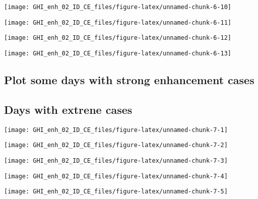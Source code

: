 \documentclass[
  10pt,
  a4paper,oneside]{article}
\begin{document}
\begin{center}\texttt{[image: GHI\_enh\_02\_ID\_CE\_files/figure-latex/unnamed-chunk-6-10]} \end{center}

\begin{center}\texttt{[image: GHI\_enh\_02\_ID\_CE\_files/figure-latex/unnamed-chunk-6-11]} \end{center}

\begin{center}\texttt{[image: GHI\_enh\_02\_ID\_CE\_files/figure-latex/unnamed-chunk-6-12]} \end{center}

\begin{center}\texttt{[image: GHI\_enh\_02\_ID\_CE\_files/figure-latex/unnamed-chunk-6-13]} \end{center}

\hypertarget{plot-some-days-with-strong-enhancement-cases}{%
\subsection{Plot some days with strong enhancement cases}\label{plot-some-days-with-strong-enhancement-cases}}

\hypertarget{days-with-extrene-cases}{%
\subsection{Days with extrene cases}\label{days-with-extrene-cases}}

\begin{center}\texttt{[image: GHI\_enh\_02\_ID\_CE\_files/figure-latex/unnamed-chunk-7-1]} \end{center}

\begin{center}\texttt{[image: GHI\_enh\_02\_ID\_CE\_files/figure-latex/unnamed-chunk-7-2]} \end{center}

\begin{center}\texttt{[image: GHI\_enh\_02\_ID\_CE\_files/figure-latex/unnamed-chunk-7-3]} \end{center}

\begin{center}\texttt{[image: GHI\_enh\_02\_ID\_CE\_files/figure-latex/unnamed-chunk-7-4]} \end{center}

\begin{center}\texttt{[image: GHI\_enh\_02\_ID\_CE\_files/figure-latex/unnamed-chunk-7-5]} \end{center}
\end{document}
